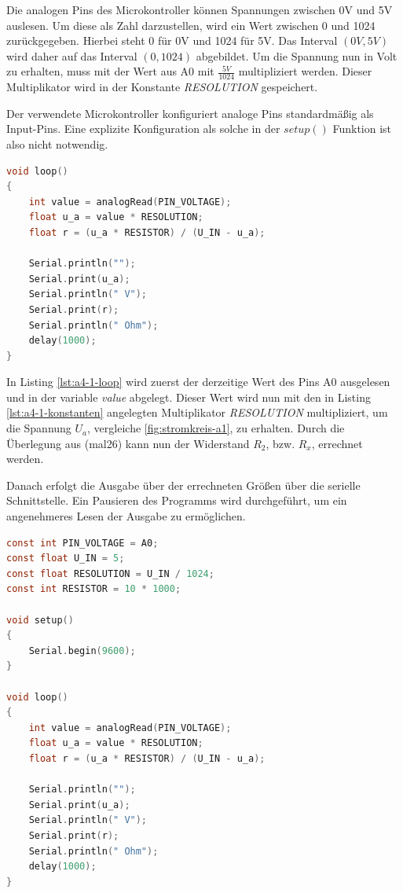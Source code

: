 Die analogen Pins des Microkontroller können Spannungen zwischen 0V und 5V auslesen.
Um diese als Zahl darzustellen, wird ein Wert zwischen 0 und 1024 zurückgegeben.
Hierbei steht 0 für 0V und 1024 für 5V.
Das Interval $(0V, 5V)$ wird daher auf das Interval $(0, 1024)$ abgebildet.
Um die Spannung nun in Volt zu erhalten, muss mit der Wert aus A0 mit $\frac{5V}{1024}$ multipliziert werden.
Dieser Multiplikator wird in der Konstante \textit{RESOLUTION} gespeichert.

Der verwendete Microkontroller konfiguriert analoge Pins standardmäßig als Input-Pins.
Eine explizite Konfiguration als solche in der $setup()$ Funktion ist also nicht notwendig.

\newpage

\begin{lstlisting}[language=C,label={lst:a4-1-loop}, caption={Programmschleife der Aufgabe 4.1}]
void loop()
{
    int value = analogRead(PIN_VOLTAGE);
    float u_a = value * RESOLUTION;
    float r = (u_a * RESISTOR) / (U_IN - u_a);

    Serial.println("");
    Serial.print(u_a);
    Serial.println(" V");
    Serial.print(r);
    Serial.println(" Ohm");
    delay(1000);
}
\end{lstlisting}

In Listing \ref{lst:a4-1-loop} wird zuerst der derzeitige Wert des Pins A0 ausgelesen und in der variable \textit{value} abgelegt.
Dieser Wert wird nun mit den in Listing \ref{lst:a4-1-konstanten} angelegten Multiplikator \textit{RESOLUTION} multipliziert, um die Spannung $U_a$, vergleiche \ref{fig:stromkreis-a1}, zu erhalten.
Durch die Überlegung aus (mal26) kann nun der Widerstand $R_2$, bzw. $R_x$, errechnet werden.

Danach erfolgt die Ausgabe über der errechneten Größen über die serielle Schnittstelle.
Ein Pausieren des Programms wird durchgeführt, um ein angenehmeres Lesen der Ausgabe zu ermöglichen.

\newpage

\begin{lstlisting}[language=C,label={lst:a4-1-programmcode}, caption={Vollständiger Programmcode der Aufgabe 4.1}]
const int PIN_VOLTAGE = A0;
const float U_IN = 5;
const float RESOLUTION = U_IN / 1024;
const int RESISTOR = 10 * 1000;

void setup()
{
    Serial.begin(9600);
}

void loop()
{
    int value = analogRead(PIN_VOLTAGE);
    float u_a = value * RESOLUTION;
    float r = (u_a * RESISTOR) / (U_IN - u_a);

    Serial.println("");
    Serial.print(u_a);
    Serial.println(" V");
    Serial.print(r);
    Serial.println(" Ohm");
    delay(1000);
}
\end{lstlisting}

